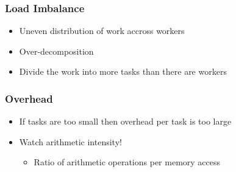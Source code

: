 \documentclass{beamer}
\begin{document}
\begin{frame}
	\frametitle{Load Imbalance}
	\begin{itemize}
	\item Uneven distribution of work accross workers
	\item Over-decomposition
	\item Divide the work into more tasks than there  are workers
	\end{itemize}
\end{frame}


\begin{frame}
	\frametitle{Overhead}
	\begin{itemize}
	\item If tasks are too small then overhead per task is too large
	\item Watch arithmetic intensity!
	\begin{itemize}
	\item Ratio of arithmetic operations per memory access
	\end{itemize}
	\end{itemize}
	
\end{frame}


    
\end{document}
